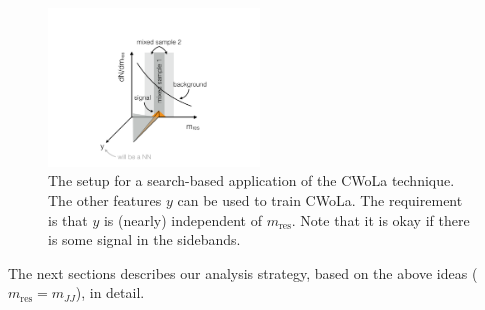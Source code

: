 \begin{figure}
\centering
\includegraphics[width=0.5\textwidth]{figures_CWoLa/cwolahuntingsetup.pdf}
\caption{The setup for a search-based application of the CWoLa technique.  The other features $y$ can be used to train CWoLa.  The requirement is that $y$ is (nearly) independent of $m_\text{res}$.  Note that it is okay if there is some signal in the sidebands.}
\label{fig:CWoLa:cwolahuntingsetup}
\end{figure}

The next sections describes our analysis strategy, based on the above ideas ($m_\text{res}=m_{JJ}$), in detail.


